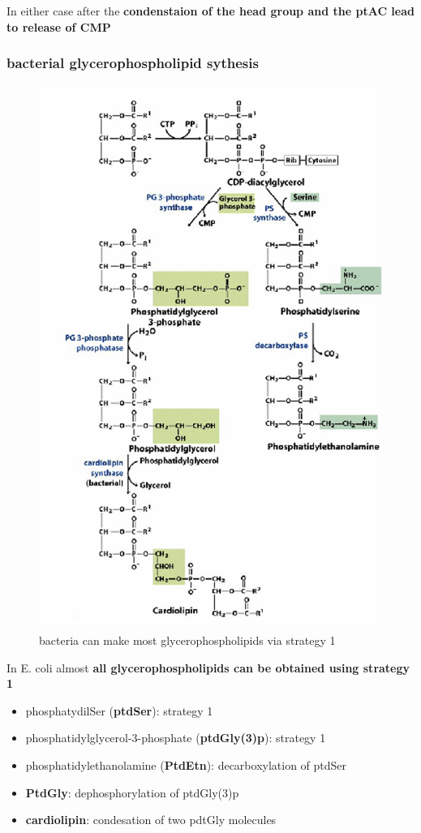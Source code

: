 \documentclass[../main.tex]{subfiles}
\begin{document}
In either case after the\textbf{ condenstaion of the head group and the ptAC lead to release of CMP}

\subsubsection{bacterial glycerophospholipid sythesis}
\begin{figure}[H]
    \centering
    \includegraphics[width=0.5\linewidth]{lectures//bcII7+bcII8/bacteria_lipids.png}
    \caption{bacteria can make most glycerophospholipids via strategy 1}
    \label{fig:enter-label}
\end{figure}
In E. coli almost \textbf{all glycerophospholipids can be obtained using strategy 1}
\begin{itemize}
    \item phosphatydilSer (\textbf{ptdSer}): strategy 1
    \item phosphatidylglycerol-3-phosphate (\textbf{ptdGly(3)p}): strategy 1
    \item phosphatidylethanolamine (\textbf{PtdEtn}): decarboxylation of ptdSer
    \item \textbf{PtdGly}: dephosphorylation of ptdGly(3)p
    \item \textbf{cardiolipin}: condesation of two pdtGly molecules
\end{itemize}
   
\end{document}
